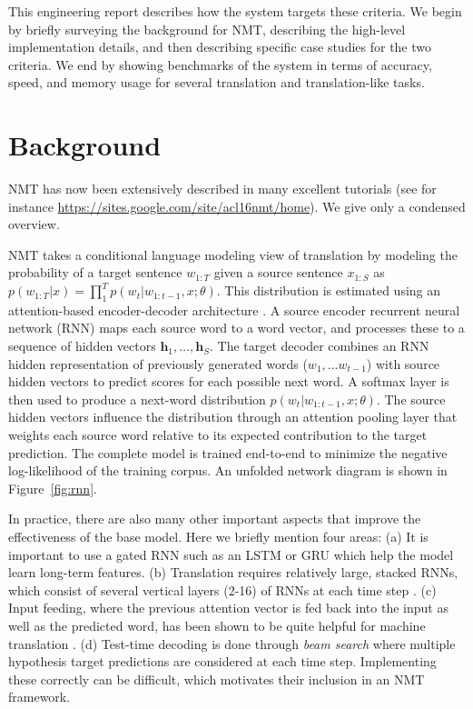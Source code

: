 \documentclass[]{article}
\begin{document}
This engineering report describes how the system targets these
criteria. We begin by briefly surveying the background for NMT,
describing the high-level implementation details, and then describing
specific case studies for the two criteria.  We end by showing
benchmarks of the system in terms of accuracy, speed, and memory usage
for several translation and translation-like tasks.



\section{Background}

NMT has now been extensively described in many
excellent tutorials (see for instance
\url{https://sites.google.com/site/acl16nmt/home}). We give only
a condensed overview. 

NMT takes a conditional language modeling view of translation by modeling the
probability of a target sentence $w_{1:T}$ given a source sentence
$x_{1:S}$ as
$p(w_{1:T}| x) = \prod_{1}^T p(w_t| w_{1:t-1}, x; \theta)$. This
distribution is estimated using an attention-based encoder-decoder
architecture \citep{Bahdanau2015}. A source encoder recurrent neural
network (RNN) maps each source word to a word vector, and processes
these to a sequence of hidden vectors
$\mathbf{h}_1, \ldots, \mathbf{h}_S$.  The target decoder combines an
RNN hidden representation of previously generated words
($w_1, ... w_{t-1}$) with source hidden vectors to predict scores for
each possible next word. A softmax layer is then used to produce a
next-word distribution $ p(w_t| w_{1:t-1}, x; \theta)$. The source
hidden vectors influence the distribution through an attention pooling
layer that weights each source word relative to its expected
contribution to the target prediction. The complete model is trained
end-to-end to minimize the negative log-likelihood of the training
corpus. An unfolded network diagram is shown in Figure~\ref{fig:rnn}.


In practice, there are also many other important aspects that improve
the effectiveness of the base model. Here we briefly mention four
areas: (a) It is important to use a gated RNN such as an LSTM
\citep{hochreiter1997long} or GRU \citep{chung2014empirical} which help
the model learn long-term features. (b) Translation requires
relatively large, stacked RNNs, which consist of several vertical
layers (2-16) of RNNs at each time step \citep{sutskever14sequence}. (c)
Input feeding, where the previous attention vector is fed back into
the input as well as the predicted word, has been shown to be quite
helpful for machine translation \citep{Luong2015}.  (d) Test-time
decoding is done through \textit{beam search} where multiple
hypothesis target predictions are considered at each time
step. Implementing these correctly can be difficult, which motivates
their inclusion in an NMT framework.
\end{document}
